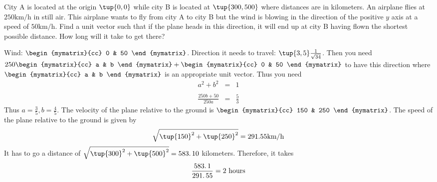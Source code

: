 \begin{enumialphparenastyle}
\begin{ex} 
City A is located at the origin $\tup{0,0 }$ while city B is located at $\tup{300,500 } $ where distances are in kilometers. An airplane flies at $250\textrm{km}/\textrm{h}$ in still air. This airplane wants to fly from city A to city
B but the wind is blowing in the direction of the positive $y$ axis at a
speed of $50\textrm{km}/\textrm{h}$. Find a unit vector such that if the plane heads
in this direction, it will end up at city B having flown the shortest
possible distance. How long will it take to get there? \vspace{1mm}
\begin{sol}
Wind: $\begin{mymatrix}{cc}
0 & 50
\end{mymatrix} $. Direction it needs to travel: $\tup{3,5 } \frac{1}{\sqrt{34}}$. Then you need $250 \begin{mymatrix}{cc}
 a & b
\end{mymatrix} + \begin{mymatrix}{cc}
0 & 50
\end{mymatrix} $ to
have this direction where $\begin{mymatrix}{cc}
 a & b
\end{mymatrix} $ is an appropriate unit
vector. Thus you need
\begin{eqnarray*}
a^{2}+b^{2} &=&1 \\ 
& & \\
\frac{250b+50}{250a} &=&\frac{5}{3}
\end{eqnarray*}
Thus $a=\frac{3}{5},b=\frac{4}{5}$. The velocity of the plane relative
to the ground is $\begin{mymatrix}{cc}
150 & 250
\end{mymatrix} $. The speed of the plane relative to the ground is given by 
\[
\sqrt{\tup{150} ^{2}+\tup{250} ^{2}}=
291.55 \textrm{km}/\textrm{h}
\]
It has to go a distance of $\sqrt{\tup{300} ^{2}+\tup{500}
^{2}}=\allowbreak 583.\,\allowbreak 10$ kilometers. Therefore, it takes
\[
\frac{\allowbreak 583.\,\allowbreak 1}{\allowbreak 291.\,\allowbreak 55}=2
\text{ hours}
\]
\end{sol}
\end{ex}


\end{enumialphparenastyle}
